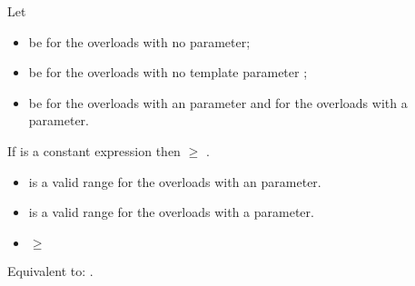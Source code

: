 \begin{itemdescr}
\pnum
Let
\begin{itemize}
 \item
    be  for the
   overloads with no  parameter;
 \item
    be  for the overloads with no
   template parameter ;
 \item
    be  for the overloads with an 
   parameter and  for the overloads with a 
   parameter.
\end{itemize}

\pnum
\mandates
If  is a constant expression then
 $\ge$ .

\pnum
\expects
\begin{itemize}
 \item
    is a valid range for the overloads with an
    parameter.
 \item
    is a valid range for the overloads with a 
   parameter.
 \item
    $\ge$ 
\end{itemize}

\pnum
\effects
Equivalent to: .
\end{itemdescr}


